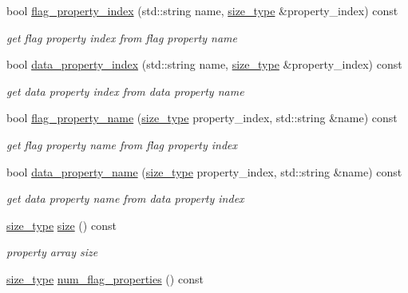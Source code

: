 \begin{DoxyCompactItemize}
bool \hyperlink{classlb_1_1property__array_ac2bab68313208cdb489d8f1d19cf1188}{flag\-\_\-property\-\_\-index} (std\-::string name, \hyperlink{classlb_1_1property__array_a76d861a6fb4b99128f627ad951918429}{size\-\_\-type} \&property\-\_\-index) const 
\begin{DoxyCompactList}\small\item\em get flag property index from flag property name \end{DoxyCompactList}\item 
bool \hyperlink{classlb_1_1property__array_a10325b2c56a1163a847d5edec38a2523}{data\-\_\-property\-\_\-index} (std\-::string name, \hyperlink{classlb_1_1property__array_a76d861a6fb4b99128f627ad951918429}{size\-\_\-type} \&property\-\_\-index) const 
\begin{DoxyCompactList}\small\item\em get data property index from data property name \end{DoxyCompactList}\item 
bool \hyperlink{classlb_1_1property__array_ac5a1f96f4f8d8972ddddd13e64568b60}{flag\-\_\-property\-\_\-name} (\hyperlink{classlb_1_1property__array_a76d861a6fb4b99128f627ad951918429}{size\-\_\-type} property\-\_\-index, std\-::string \&name) const 
\begin{DoxyCompactList}\small\item\em get flag property name from flag property index \end{DoxyCompactList}\item 
bool \hyperlink{classlb_1_1property__array_a2190f7d3a8d06c1899a8b898d7c9addd}{data\-\_\-property\-\_\-name} (\hyperlink{classlb_1_1property__array_a76d861a6fb4b99128f627ad951918429}{size\-\_\-type} property\-\_\-index, std\-::string \&name) const 
\begin{DoxyCompactList}\small\item\em get data property name from data property index \end{DoxyCompactList}\item 
\hypertarget{classlb_1_1property__array_aef6d4478adf6211fde06520d0802c5c2}{\hyperlink{classlb_1_1property__array_a76d861a6fb4b99128f627ad951918429}{size\-\_\-type} \hyperlink{classlb_1_1property__array_aef6d4478adf6211fde06520d0802c5c2}{size} () const }\label{classlb_1_1property__array_aef6d4478adf6211fde06520d0802c5c2}

\begin{DoxyCompactList}\small\item\em property array size \end{DoxyCompactList}\item 
\hypertarget{classlb_1_1property__array_a960838eb37f5459899f3da3fd645a214}{\hyperlink{classlb_1_1property__array_a76d861a6fb4b99128f627ad951918429}{size\-\_\-type} \hyperlink{classlb_1_1property__array_a960838eb37f5459899f3da3fd645a214}{num\-\_\-flag\-\_\-properties} () const }\label{classlb_1_1property__array_a960838eb37f5459899f3da3fd645a214}


\end{DoxyCompactItemize}
